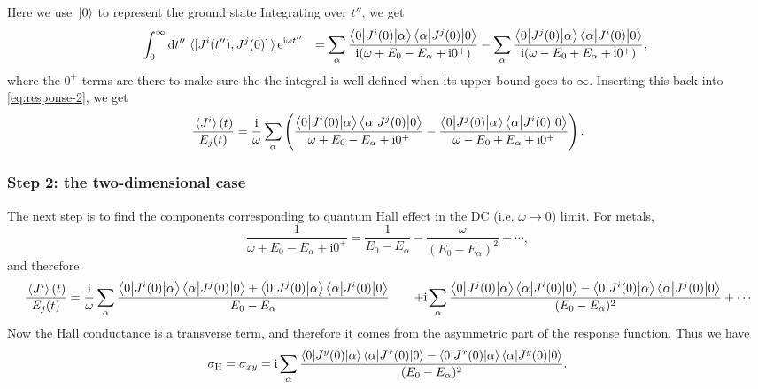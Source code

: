 \documentclass[hyperref, a4paper]{article}
\newcommand*{\ii}{\mathrm{i}}
\newcommand*{\ee}{\mathrm{e}}
\def\\{}%
\begin{document}
Here we use $\ket*{0}$ to represent the ground state 
Integrating over $t''$, we get 
\[
    \begin{aligned}
        &\quad \int_{0}^{\infty} \dd{t''} \expval*{\comm*{J^i(t'')}{J^j(0)}} \ee^{\ii \omega t''} \\
        &= \sum_\alpha \frac{\mel**{0}{J^i(0)}{\alpha} \mel**{\alpha}{J^j(0)}{0}}{\ii (\omega + E_0 - E_\alpha + \ii 0^+)}
        - \sum_\alpha \frac{\mel**{0}{J^j(0)}{\alpha} \mel**{\alpha}{J^i(0)}{0}}{\ii (\omega - E_0 + E_\alpha + \ii 0^+)},
    \end{aligned}
\]
where the $0^+$ terms are there to make sure 
the the integral is well-defined when its upper bound goes to $\infty$.
Inserting this back into \eqref{eq:response-2}, 
we get 
\begin{equation}
    \frac{\expval*{J^i}(t)}{E_j(t)} = \frac{\ii}{\omega} \sum_\alpha \left(
        \frac{\mel**{0}{J^i(0)}{\alpha} \mel**{\alpha}{J^j(0)}{0}}{ \omega + E_0 - E_\alpha + \ii 0^+}
        - \frac{\mel**{0}{J^j(0)}{\alpha} \mel**{\alpha}{J^i(0)}{0}}{\omega - E_0 + E_\alpha + \ii 0^+}
    \right).
\end{equation}

\subsubsection{Step 2: the two-dimensional case}

The next step is to find the components corresponding to quantum Hall effect 
in the DC (i.e. $\omega \to 0$) limit.
For metals, 
\[
    \frac{1}{\omega + E_0 - E_\alpha + \ii 0^+} = 
    \frac{1}{E_0 - E_\alpha} - \frac{\omega}{(E_0 - E_\alpha)^2} + \cdots,
\] 
and therefore 
\begin{equation}
    \begin{aligned}
        \frac{\expval*{J^i}(t)}{E_j(t)} &= 
        \frac{\ii}{\omega} \sum_\alpha
        \frac{
            \mel**{0}{J^i(0)}{\alpha} \mel**{\alpha}{J^j(0)}{0}
            + \mel**{0}{J^j(0)}{\alpha} \mel**{\alpha}{J^i(0)}{0}
        }{E_0 - E_\alpha} \\
        &\quad + \ii \sum_{\alpha}
        \frac{
            \mel**{0}{J^j(0)}{\alpha} \mel**{\alpha}{J^i(0)}{0}
            - \mel**{0}{J^i(0)}{\alpha} \mel**{\alpha}{J^j(0)}{0}
        }{(E_0 - E_\alpha)^2} + \cdots
    \end{aligned}
\end{equation}
Now the Hall conductance is a transverse term,
and therefore it comes from the asymmetric part of the response function.
Thus we have 
\begin{equation}
    \sigma_{\text{H}} = \sigma_{xy} = \ii \sum_{\alpha}
    \frac{
        \mel**{0}{J^y(0)}{\alpha} \mel**{\alpha}{J^x(0)}{0}
        - \mel**{0}{J^x(0)}{\alpha} \mel**{\alpha}{J^y(0)}{0}
    }{(E_0 - E_\alpha)^2} .
    \label{eq:hall-conductance-intermediate-1}
\end{equation}
\end{document}

